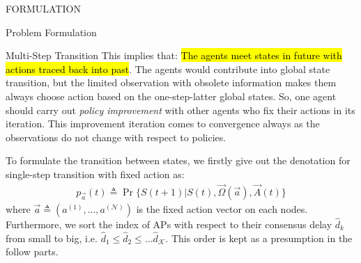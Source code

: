 \documentclass[10pt, conference, letterpaper]{IEEEtran}
\begin{document}
\begin{section}{FORMULATION}
\begin{subsection}{Problem Formulation}
\begin{subsubsection}{Multi-Step Transition}
                This implies that: \hl{The agents meet states in future with actions traced back into past}. The agents would contribute into global state transition, but the limited observation with obsolete information makes them always choose action based on the one-step-latter global states. So, one agent should carry out \emph{policy improvement} with other agents who fix their actions in its iteration. This improvement iteration comes to convergence always as the observations do not change with respect to policies.

                To formulate the transition between states, we firstly give out the denotation for single-step transition with fixed action as:
                \begin{align}
                    p_{\vec{a}}(t) \triangleq \Pr\{ S(t+1)|S(t), \vec{\Omega}(\vec{a}),\vec{A}(t) \}
                \end{align}
                where $\vec{a} \triangleq (a^{(1)}, \dots, a^{(\mathcal{N})})$ is the fixed action vector on each nodes. Furthermore, we sort the index of APs with respect to their consensus delay $\hat{d}_k$ from small to big, i.e. $\hat{d}_1 \leq \hat{d}_2 \leq \dots \hat{d}_{\mathcal{K}}$. This order is kept as a presumption in the follow parts.


\end{subsubsection}
\end{subsection}
\end{section}
\end{document}
